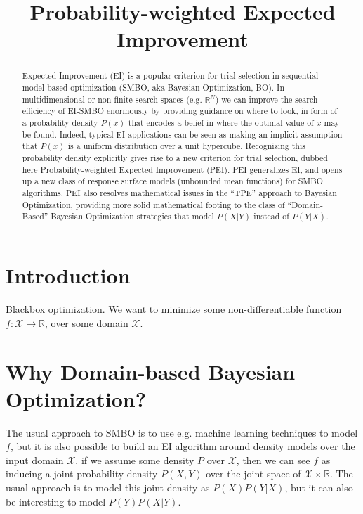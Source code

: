 \documentclass{article}
\title{Probability-weighted Expected Improvement}
\begin{document}
\maketitle

\begin{abstract}
Expected Improvement (EI) is a popular criterion for trial selection in sequential model-based optimization (SMBO, aka Bayesian Optimization, BO).
In multidimensional or non-finite search spaces (e.g. $\mathbb{R}^N$) we can improve the search efficiency of EI-SMBO enormously by
providing guidance on where to look, in form of a probability density $P(x)$ that encodes a belief in where the optimal value of $x$ may be found.
Indeed, typical EI applications can be seen as making an implicit assumption that $P(x)$ is a uniform distribution over a unit hypercube.
Recognizing this probability density explicitly gives rise to a new criterion for trial selection,
dubbed here Probability-weighted Expected Improvement (PEI).
PEI generalizes EI, and opens up a new class of response surface models (unbounded mean functions) for SMBO algorithms.
PEI also resolves mathematical issues in the ``TPE'' approach to Bayesian Optimization, providing more solid mathematical footing to the class of ``Domain-Based''
Bayesian Optimization strategies that model $P(X|Y)$ instead of $P(Y|X)$.
\end{abstract}

\section{Introduction}

    Blackbox optimization.
    We want to minimize some non-differentiable function $f: {\mathcal X} \rightarrow \mathbb{R}$, over some domain $\mathcal X$.

\section{Why Domain-based Bayesian Optimization?}

    The usual approach to SMBO is to use e.g. machine learning techniques to model $f$, but it is also possible to build an EI algorithm around
    density models over the input domain $\mathcal X$.
    if we assume some density $P$ over $\mathcal X$, then
    we can see $f$ as inducing a joint probability density $P(X, Y)$ over the joint space of ${\mathcal X} \times \mathbb{R}$.
    The usual approach is to model this joint density as $P(X)P(Y|X)$,
    but it can also be interesting to model $P(Y)P(X|Y)$.
\end{document}
